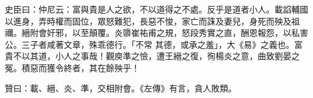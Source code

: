 \begin{pinyinscope}
 史臣曰：仲尼云：富與貴是人之欲，不以道得之不處。反乎是道者小人。載諂輔國以進身，弄時權而固位，眾怒難犯，長惡不悛，家亡而誅及妻兒，身死而殃及祖禰。縉附會奸邪，以至顛覆。炎隳崔祐甫之規，怒段秀實之直，酬恩報怨，以私害公。三子者咸著文章，殊乖德行。「不常
 其德，或承之羞」，大《易》之義也。富貴不以其道，小人之事哉！觀庾準之憸，遭王縉之復，徇楊炎之意，曲致劉晏之冤。積惡而獲令終者，其在餘殃乎！



 贊曰：載、縉、炎、準，交相附會。《左傳》有言，貪人敗類。



\end{pinyinscope}